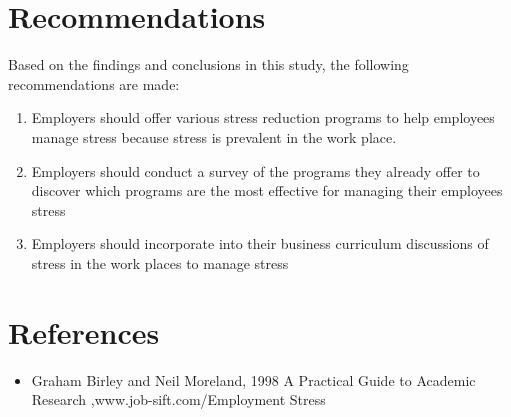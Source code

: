 \documentclass[10pt,]{article}
\begin{document}
\section{Recommendations }
Based on the findings and conclusions in this study, the following recommendations are made:
\begin{enumerate}
\item Employers should offer various stress reduction programs to help employees manage stress because stress is prevalent in the work place.
\item Employers should conduct a survey of the programs they already offer to discover which programs are the most effective for managing their employees stress
\item Employers should incorporate into their business curriculum discussions of stress in the work places to manage stress
\end{enumerate}
\section{References}
\begin{itemize}
\item Graham Birley and Neil Moreland, 1998 A Practical Guide to Academic Research ,www.job-sift.com/Employment Stress 
\end{itemize}
\end{document}
